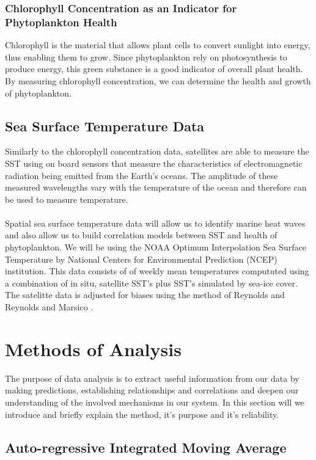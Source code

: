 \subsubsection{Chlorophyll Concentration as an Indicator for Phytoplankton Health}\label{subsec:chl phyt}

Chlorophyll is the material that allows plant cells to convert sunlight into energy, thus enabling them to grow. Since phytoplankton rely on photosynthesis to produce energy, this green substance is a good indicator of overall plant health. By measuring chlorophyll concentration, we can determine the health and growth of phytoplankton.

\subsection{Sea Surface Temperature Data}

Similarly to the chlorophyll concentration data, satellites are able to measure the SST using on board sensors that measure the characteristics of electromagnetic radiation being emitted from the Earth's oceans. The amplitude of these measured wavelengths vary with the temperature of the ocean and therefore can be used to measure temperature. 
\\\\
Spatial sea surface temperature data will allow us to identify marine heat waves and also allow us to build correlation models between SST and health of phytoplankton. We will be using the NOAA Optimum Interpolation Sea Surface Temperature by National Centers for Environmental Prediction (NCEP) institution. This data consists of of weekly mean temperatures compututed using a combination of in situ, satellite SST's plus SST's simulated by sea-ice cover. The satelitte data is adjusted for biases using the method of Reynolds \cite{reynolds1988real} and Reynolds and Marsico \cite{1993reynolds}.

\section{Methods of Analysis}

The purpose of data analysis is to extract useful information from our data by making predictions, establishing relationships and correlations and deepen our understanding of the involved mechanisms in our system. In this section will we introduce and briefly explain the method, it's purpose and it's reliability.

\subsection{Auto-regressive Integrated Moving Average}\label{subsec:ARIMA}

